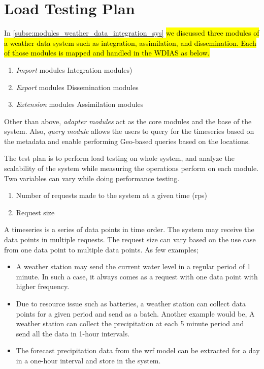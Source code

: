 \section{Load Testing Plan}
\label{se:test_plan}

In \cref{subse:modules_weather_data_integration_sys} \hl{we discussed three modules of a weather data system such as integration, assimilation, and dissemination. Each of those modules is mapped and handled in the WDIAS as below.}
\begin{enumerate}
    \item \emph{Import} modules \leftarrow Integration modules)
    \item \emph{Export} modules \leftarrow Dissemination modules
    \item \emph{Extension} modules \leftarrow Assimilation modules
\end{enumerate}
Other than above, \emph{adapter modules} act as the core modules and the base of the system. Also, \emph{query module} allows the users to query for the timeseries based on the metadata and enable performing Geo-based queries based on the locations.

The test plan is to perform load testing on whole system, and analyze the scalability of the system while measuring the operations perform on each module. Two variables can vary while doing performance testing.
\begin{enumerate}
    \item Number of requests made to the system at a given time (\acrfull{rps})
    \item Request size
\end{enumerate}
A timeseries is a series of data points in time order. The system may receive the data points in multiple requests.
The request size can vary based on the use case from one data point to multiple data points. As few examples;
\begin{itemize}
    \item A weather station may send the current water level in a regular period of 1 minute. In such a case, it always comes as a request with one data point with higher frequency.
    \item Due to resource issue such as batteries, a weather station can collect data points for a given period and send as a batch. Another example would be,
A weather station can collect the precipitation at each 5 minute period and send all the data in 1-hour intervals.
    \item The forecast precipitation data from the \acrshort{wrf} model can be extracted for a day in a one-hour interval and store in the system.
\end{itemize}

